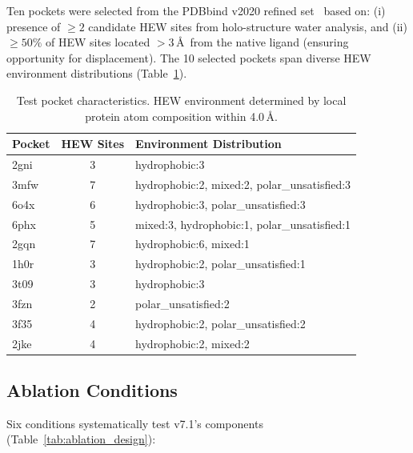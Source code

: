 \documentclass[11pt,letterpaper]{article}
\begin{document}
Ten pockets were selected from the PDBbind v2020 refined set~\cite{wang2004pdbbind}
based on: (i) presence of $\ge 2$ candidate HEW sites from holo-structure water
analysis, and (ii) $\ge 50\%$ of HEW sites located $> 3$\,\AA\ from the native
ligand (ensuring opportunity for displacement).  The 10 selected pockets span
diverse HEW environment distributions (Table~\ref{tab:pockets}).

\begin{table}[H]
  \centering
  \caption{Test pocket characteristics.  HEW environment determined by local
           protein atom composition within 4.0\,\AA.}
  \label{tab:pockets}
  \small
  \begin{tabular}{l c l}
    \toprule
    \textbf{Pocket} & \textbf{HEW Sites} & \textbf{Environment Distribution} \\
    \midrule
    2gni & 3 & hydrophobic:3 \\
    3mfw & 7 & hydrophobic:2, mixed:2, polar\_unsatisfied:3 \\
    6o4x & 6 & hydrophobic:3, polar\_unsatisfied:3 \\
    6phx & 5 & mixed:3, hydrophobic:1, polar\_unsatisfied:1 \\
    2gqn & 7 & hydrophobic:6, mixed:1 \\
    1h0r & 3 & hydrophobic:2, polar\_unsatisfied:1 \\
    3t09 & 3 & hydrophobic:3 \\
    3fzn & 2 & polar\_unsatisfied:2 \\
    3f35 & 4 & hydrophobic:2, polar\_unsatisfied:2 \\
    2jke & 4 & hydrophobic:2, mixed:2 \\
    \bottomrule
  \end{tabular}
\end{table}

\subsection{Ablation Conditions}

Six conditions systematically test v7.1's components (Table~\ref{tab:ablation_design}):
\end{document}
